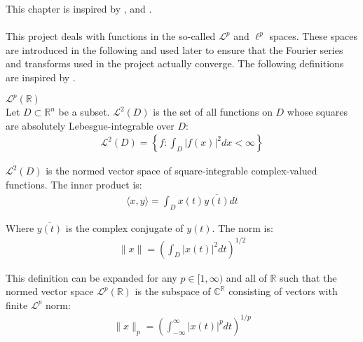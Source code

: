This chapter is inspired by \cite{FAA}, \cite{FSP} and \cite{FTFA}.
\\ \\
This project deals with functions in the so-called $\mathcal{L}^p$ and $\ell^p$ spaces. These spaces are introduced in the following and used later to ensure that the Fourier series and transforms used in the project actually converge. The following definitions are inspired by \cite{page 31, FSP}.

\begin{definition}{$\mathcal{L}^p(\mathbb{R})$}
\\
Let $D \subset \mathbb{R}^n$ be a subset. $\mathcal{L}^2(D)$ is the set of all functions on $D$ whose squares are absolutely Lebesgue-integrable over $D$:
\begin{align*}
\mathcal{L}^2(D) = \left\{ f: \int_D |f(x)|^2 dx < \infty \right\}
\end{align*}

$\mathcal{L}^2(D)$ is the normed vector space of square-integrable complex-valued functions. The inner product is:
\begin{align*}
\langle x,y \rangle =  \int_D x(t) \overline{y(t)} dt
\end{align*}

Where $\overline{y(t)}$ is the complex conjugate of $y(t)$. The norm is:
\begin{align*}
\|x\| = \left( \int_D |x(t)|^2 dt \right)^{1/2}
\end{align*}

This definition can be expanded for any $p \in [1,\infty)$ and all of $\mathbb{R}$ such that the normed vector space $\mathcal{L}^p(\mathbb{R})$ is the subspace of $\mathbb{C}^\mathbb{R}$ consisting of vectors with finite $\mathcal{L}^p$ norm:
\begin{align*}
\|x\|_p = \left( \int_{-\infty}^\infty |x(t)|^p dt \right)^{1/p}
\end{align*}
\end{definition}

